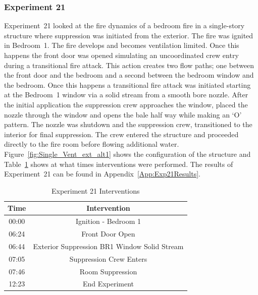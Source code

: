 \documentclass[12pt,oneside]{book}
\begin{document}
\subsubsection{Experiment 21}
Experiment~21 looked at the fire dynamics of a bedroom fire in a single-story structure where suppression was initiated from the exterior. The fire was ignited in Bedroom~1. The fire develops and becomes ventilation limited. Once this happens the front door was opened simulating an uncoordinated crew entry during a transitional fire attack. This action creates two flow paths; one between the front door and the bedroom and a second between the bedroom window and the bedroom. Once this happens a transitional fire attack was initiated starting at the Bedroom~1 window via a solid stream from a smooth bore nozzle. After the initial application the suppression crew approaches the window, placed the nozzle through the window and opens the bale half way while making an `O' pattern. The nozzle was shutdown and the suppression crew, transitioned to the interior for final suppression. The crew entered the structure and proceeded directly to the fire room before flowing additional water. Figure~\ref{fig:Single_Vent_ext_alt1} shows the configuration of the structure and Table~\ref{Table:Exp21Interventions} shows at what times interventions were performed. The results of Experiment~21 can be found in Appendix~\ref{App:Exp21Results}. 


\begin{table}[H]
	\centering
	\caption{Experiment 21 Interventions}
	\begin{tabular}{|c|c|} 
		\hline
		Time & Intervention \\ \hline \hline
		00:00 & Ignition - Bedroom 1 \\ \hline
		06:24 & Front Door Open \\ \hline
		06:44 & Exterior Suppression BR1 Window Solid Stream \\ \hline
		07:05 & Suppression Crew Enters\\ \hline
		07:46 & Room Suppression \\ \hline 
		12:23 & End Experiment\\ \hline
	\end{tabular}
	\label{Table:Exp21Interventions}
\end{table}

\FloatBarrier
\end{document}
